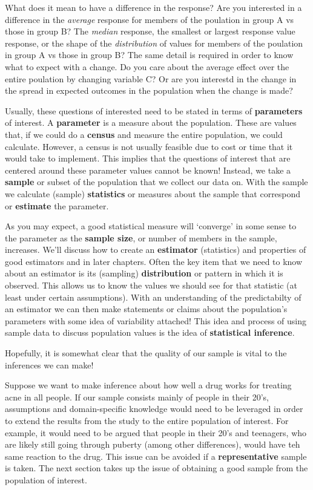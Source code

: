 \documentclass[
]{book}
\theoremstyle{definition}
\theoremstyle{definition}
\theoremstyle{definition}
\theoremstyle{remark}
\begin{document}
What does it mean to have a difference in the response? Are you interested in a difference in the \emph{average} response for members of the poulation in group A vs those in group B? The \emph{median} response, the smallest or largest response value response, or the shape of the \emph{distribution} of values for members of the poulation in group A vs those in group B? The same detail is required in order to know what to expect with a change. Do you care about the average effect over the entire poulation by changing variable C? Or are you interestd in the change in the spread in expected outcomes in the population when the change is made?

Usually, these questions of interested need to be stated in terms of \textbf{parameters} of interest. A \textbf{parameter} is a measure about the population. These are values that, if we could do a \textbf{census} and measure the entire population, we could calculate. However, a census is not usually feasible due to cost or time that it would take to implement. This implies that the questions of interest that are centered around these parameter values cannot be known! Instead, we take a \textbf{sample} or subset of the population that we collect our data on. With the sample we calculate (sample) \textbf{statistics} or measures about the sample that correspond or \textbf{estimate} the parameter.

As you may expect, a good statistical measure will `converge' in some sense to the parameter as the \textbf{sample size}, or number of members in the sample, increases. We'll discuss how to create an \textbf{estimator} (statistics) and properties of good estimators and in later chapters. Often the key item that we need to know about an estimator is its (sampling) \textbf{distribution} or pattern in which it is observed. This allows us to know the values we should see for that statistic (at least under certain assumptions). With an understanding of the predictabilty of an estimator we can then make statements or claims about the population's parameters with some idea of variability attached! This idea and process of using sample data to discuss population values is the idea of \textbf{statistical inference}.

Hopefully, it is somewhat clear that the quality of our sample is vital to the inferences we can make!

Suppose we want to make inference about how well a drug works for treating acne in all people. If our sample consists mainly of people in their 20's, assumptions and domain-specific knowledge would need to be leveraged in order to extend the results from the study to the entire population of interest. For example, it would need to be argued that people in their 20's and teenagers, who are likely still going through puberty (among other differences), would have teh same reaction to the drug. This issue can be avoided if a \textbf{representative} sample is taken. The next section takes up the issue of obtaining a good sample from the population of interest.
\end{document}
